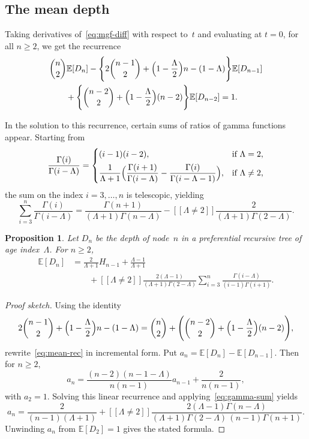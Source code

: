 \documentclass[11pt]{article}
\newtheorem{proposition}{Proposition}
\theoremstyle{remark}
\newcommand{\E}{\mathbb{E}}
\newcommand{\iverson}[1]{[\![#1]\!]}
\begin{document}
\subsection{The mean depth}

Taking derivatives of~\eqref{eq:mgf-diff} with respect to~$t$ and evaluating at
\(t=0\), for all \(n\ge 2\), we get the recurrence
\begin{align}
&\binom{n}{2}\E[D_n]
-\Biggl\{2\binom{n-1}{2}
+\Bigl(1-\frac{\Lambda}{2}\Bigr)n-(1-\Lambda)\Biggr\}\E[D_{n-1}]
\nonumber\\
&\qquad
+\Biggl\{\binom{n-2}{2}
+\Bigl(1-\frac{\Lambda}{2}\Bigr)(n-2)\Biggr\}\E[D_{n-2}]
=1.
\label{eq:mean-rec}
\end{align}

In the solution to this recurrence, certain sums of ratios of gamma functions
appear. Starting from
\[
\frac{\Gamma(i)}{\Gamma(i-\Lambda)}
=
\begin{cases}
(i-1)(i-2), & \text{if }\Lambda=2,\\[0.4em]
\dfrac{1}{\Lambda+1}
\Bigl(
\dfrac{\Gamma(i+1)}{\Gamma(i-\Lambda)}
-
\dfrac{\Gamma(i)}{\Gamma(i-\Lambda-1)}
\Bigr),
& \text{if }\Lambda\neq 2,
\end{cases}
\]
the sum on the index \(i=3,\ldots,n\) is telescopic, yielding
\begin{equation}
\sum_{i=3}^n\frac{\Gamma(i)}{\Gamma(i-\Lambda)}
=\frac{\Gamma(n+1)}{(\Lambda+1)\Gamma(n-\Lambda)}
-\iverson{\Lambda\neq 2}\frac{2}{(\Lambda+1)\Gamma(2-\Lambda)}.
\label{eq:gamma-sum}
\end{equation}

\begin{proposition}
\label{prop:exact-mean}
Let \(D_n\) be the depth of node~$n$ in a preferential recursive tree of age
index~$\Lambda$. For \(n\ge 2\),
\begin{align*}
\E[D_n]
&=\frac{2}{\Lambda+1}H_{n-1}+\frac{\Lambda-1}{\Lambda+1}
\\
&\qquad
+\iverson{\Lambda\neq 2}
\frac{2(\Lambda-1)}{(\Lambda+1)\Gamma(2-\Lambda)}
\sum_{i=3}^n\frac{\Gamma(i-\Lambda)}{(i-1)\Gamma(i+1)}.
\end{align*}
\end{proposition}

\begin{proof}[Proof sketch]
Using the identity
\begin{equation}
2\binom{n-1}{2}
+\Bigl(1-\frac{\Lambda}{2}\Bigr)n-(1-\Lambda)
=
\binom{n}{2}
+\Biggl(\binom{n-2}{2}
+\Bigl(1-\frac{\Lambda}{2}\Bigr)(n-2)\Biggr),
\label{eq:bin-id}
\end{equation}
rewrite~\eqref{eq:mean-rec} in incremental form. Put
\(a_n=\E[D_n]-\E[D_{n-1}]\). Then for \(n\ge 2\),
\[
a_n=\frac{(n-2)(n-1-\Lambda)}{n(n-1)}a_{n-1}+\frac{2}{n(n-1)},
\]
with \(a_2=1\). Solving this linear recurrence and applying~\eqref{eq:gamma-sum}
yields
\[
a_n=\frac{2}{(n-1)(\Lambda+1)}
+\iverson{\Lambda\neq 2}
\frac{2(\Lambda-1)\Gamma(n-\Lambda)}{(\Lambda+1)\Gamma(2-\Lambda)\,(n-1)\Gamma(n+1)}.
\]
Unwinding \(a_n\) from \(\E[D_2]=1\) gives the stated formula.
\end{proof}
\end{document}
